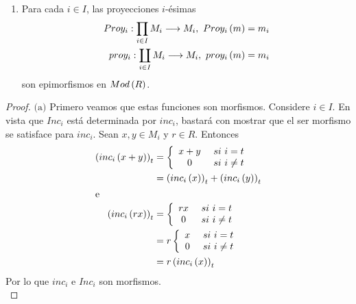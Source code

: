 \documentclass{article}
\begin{document}
\begin{enumerate}[label=\textbf{Ej \arabic*.}]
\begin{enumerate}
			\item Para cada $i \in I$, las proyecciones $i$-ésimas
			\begin{equation*}
				\begin{split}
					Proy_{i}:\displaystyle\prod_{i \in I} M_{i} \longrightarrow M_{i},\ Proy_{i}\left(m\right)=m_{i}\\
					proy_{i}:\displaystyle\coprod_{i \in I} M_{i} \longrightarrow M_{i},\ proy_{i}\left(m\right)=m_{i}
				\end{split}
			\end{equation*}
			son epimorfismos en $Mod\left(R\right)$.
		\end{enumerate}
		\begin{proof}
			$\boxed{\text{(a)}}$ Primero veamos que estas funciones son morfismos. Considere $i \in I$. En vista que $Inc_{i}$ está determinada por $inc_{i}$, bastará con mostrar que el ser morfismo se satisface para $inc_{i}$. Sean $x,y \in M_{i}$ y $r \in R$. Entonces
			\begin{align*}
				\lrprth{inc_{i}\lrprth{x+y}}_{t}&=\left\{\begin{array}{cc} x+y\ & si\ i=t\\0\ & si\ i \neq t \end{array}\right.\\
				&=\lrprth{inc_{i}\lrprth{x}}_{t}+\lrprth{inc_{i}\lrprth{y}}_{t}\\
				\intertext{e}
				\lrprth{inc_{i}\lrprth{rx}}_{t}&=\left\{\begin{array}{cc} rx\ & si\ i=t\\0\ & si\ i \neq t \end{array}\right.\\
				&=r\left\{\begin{array}{cc} x\ & si\ i=t\\0\ & si\ i \neq t \end{array}\right.\\
				&=r\lrprth{inc_{i}\lrprth{x}}_{t}
			\end{align*}
			Por lo que $inc_{i}$ e $Inc_{i}$ son morfismos.\\
		

\end{proof}
\end{enumerate}
\end{document}
